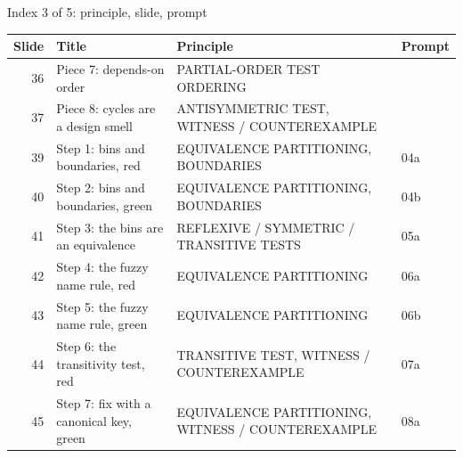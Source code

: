 \begin{frame}{Index 3 of 5: principle, slide, prompt}
\scriptsize
\begin{tabular}{@{}r>{\raggedright\arraybackslash}p{5.4cm}>{\raggedright\arraybackslash}p{4.6cm}p{1.2cm}@{}}
\textbf{Slide} & \textbf{Title} & \textbf{Principle} & \textbf{Prompt}\\\midrule
36 & Piece 7: depends-on order & PARTIAL-ORDER TEST ORDERING & \\
37 & Piece 8: cycles are a design smell & ANTISYMMETRIC TEST, WITNESS / COUNTEREXAMPLE & \\
39 & Step 1: bins and boundaries, red & EQUIVALENCE PARTITIONING, BOUNDARIES & 04a\\
40 & Step 2: bins and boundaries, green & EQUIVALENCE PARTITIONING, BOUNDARIES & 04b\\
41 & Step 3: the bins are an equivalence & REFLEXIVE / SYMMETRIC / TRANSITIVE TESTS & 05a\\
42 & Step 4: the fuzzy name rule, red & EQUIVALENCE PARTITIONING & 06a\\
43 & Step 5: the fuzzy name rule, green & EQUIVALENCE PARTITIONING & 06b\\
44 & Step 6: the transitivity test, red & TRANSITIVE TEST, WITNESS / COUNTEREXAMPLE & 07a\\
45 & Step 7: fix with a canonical key, green & EQUIVALENCE PARTITIONING, WITNESS / COUNTEREXAMPLE & 08a\\
\end{tabular}
\end{frame}
